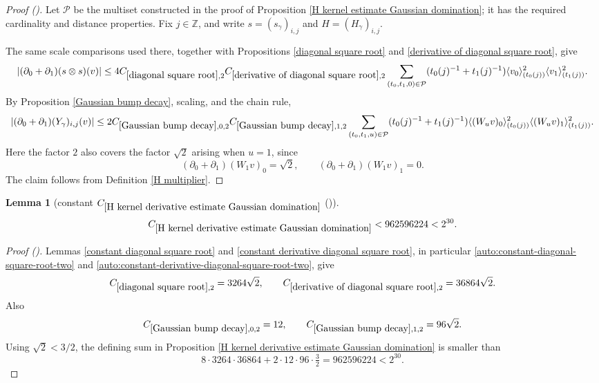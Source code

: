 \documentclass[12pt,reqno]{amsart}
\newcommand{\auto}{{({\tiny\faCar})}}
\theoremstyle{plain}
\newtheorem{lemma}[theorem]{Lemma}
\numberwithin{equation}{section}
\theoremstyle{remark}
\newcommand{\uses}[1]{}
\newcommand{\usesdefs}[1]{}
\newcommand{\Z}{{\mathbb Z}}
\begin{document}
\begin{proof}[Proof \auto]
Let $\mathcal P$ be the multiset constructed in the proof of
Proposition \ref{H kernel estimate Gaussian domination}; it has the
required cardinality and distance properties. Fix $j\in\Z$, and write
$s=(s_\gamma)_{i,j}$ and $H=(H_\gamma)_{i,j}$.

The same scale comparisons used there, together with Propositions
\ref{diagonal square root} and
\ref{derivative of diagonal square root}, give
\[
|(\partial_0+\partial_1)(s\otimes s)(v)|
\le
4C_{\ref{diagonal square root},2}
C_{\ref{derivative of diagonal square root},2}
\sum_{(t_0,t_1,0)\in\mathcal P}
(t_0(j)^{-1}+t_1(j)^{-1})
\langle v_0\rangle_{(t_0(j))}^2
\langle v_1\rangle_{(t_1(j))}^2.
\]
By Proposition \ref{Gaussian bump decay}, scaling, and the chain rule,
\[
|(\partial_0+\partial_1)(Y_\gamma)_{i,j}(v)|
\le
2C_{\ref{Gaussian bump decay},0,2}
C_{\ref{Gaussian bump decay},1,2}
\sum_{(t_0,t_1,u)\in\mathcal P}
(t_0(j)^{-1}+t_1(j)^{-1})
\langle (W_uv)_0\rangle_{(t_0(j))}^2
\langle (W_uv)_1\rangle_{(t_1(j))}^2.
\]
Here the factor $2$ also covers the factor $\sqrt2$ arising when
$u=1$, since
\[
(\partial_0+\partial_1)(W_1v)_0=\sqrt2,
\qquad
(\partial_0+\partial_1)(W_1v)_1=0.
\]
The claim follows from Definition \ref{H multiplier}.
\end{proof}

\begin{lemma}[constant $C_{\ref{H kernel derivative estimate Gaussian domination}}$ \auto]\label{constant H kernel derivative estimate Gaussian domination}\uses{constant diagonal square root,constant derivative diagonal square root,diagonal square root,derivative of diagonal square root,Gaussian bump decay,H kernel derivative estimate Gaussian domination}\usesdefs{}
\begin{equation}\label{constant H kernel derivative estimate Gaussian domination bound}
C_{\ref{H kernel derivative estimate Gaussian domination}}
<962596224<2^{30}.
\end{equation}
\end{lemma}
\begin{proof}[Proof \auto]
Lemmas \ref{constant diagonal square root} and \ref{constant derivative diagonal square root}, in particular \eqref{auto:constant-diagonal-square-root-two} and \eqref{auto:constant-derivative-diagonal-square-root-two}, give
\[
C_{\ref{diagonal square root},2}=3264\sqrt2,
\qquad
C_{\ref{derivative of diagonal square root},2}=36864\sqrt2.
\]
Also
\[
C_{\ref{Gaussian bump decay},0,2}=12,
\qquad
C_{\ref{Gaussian bump decay},1,2}=96\sqrt2.
\]
Using $\sqrt2<3/2$, the defining sum in Proposition \ref{H kernel derivative estimate Gaussian domination} is smaller than
\[
8\cdot3264\cdot36864+2\cdot12\cdot96\cdot\tfrac32
=962596224<2^{30}.
\]
\end{proof}
\end{document}
